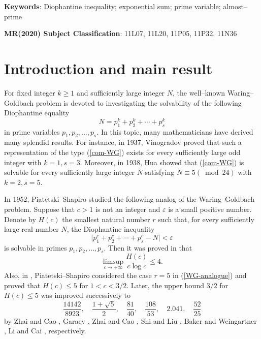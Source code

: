 \documentclass[a4paper,oneside,11pt]{article}%
\numberwithin{equation}{section}
\begin{document}
{\textbf{Keywords}}: Diophantine inequality; exponential sum; prime variable; almost--prime


{\textbf{MR(2020) Subject Classification}}: 11L07, 11L20, 11P05, 11P32, 11N36



\section{Introduction and main result}
For fixed integer $k\geqslant1$ and sufficiently large integer $N$, the well--known Waring--Goldbach problem is devoted to investigating the solvability of the following Diophantine equality
\begin{equation}\label{com-WG}
  N=p_1^k+p_2^k+\cdots+p_s^k
\end{equation}
in prime variables $p_1,p_2,\dots,p_s$. In this topic, many mathematicians have derived many splendid results. For instance, in 1937, Vinogradov \cite{Vinogradov-1937} proved that such a representation of the type (\ref{com-WG}) exists for every sufficiently large odd integer with $k=1,s=3$. Moreover, in 1938, Hua \cite{Hua-1938} showed that (\ref{com-WG}) is solvable
for every sufficiently large integer $N$ satisfying $N\equiv 5(\bmod {24})$ with $k=2,s=5$.

In 1952, Piatetski--Shapiro \cite{Piatetski-Shapiro-1952} studied the following analog of the Waring--Goldbach problem. Suppose that $c>1$ is not an integer and $\varepsilon$ is a small positive number. Denote by $H(c)$ the smallest natural number $r$ such that, for every
sufficiently large real number $N$, the Diophantine inequality
\begin{equation}\label{WG-analogue}
  \big|p_1^c+p_2^c+\cdots+p_s^c-N\big|<\varepsilon
\end{equation}
is solvable in primes $p_1,p_2,\dots,p_s$. Then it was proved in \cite{Piatetski-Shapiro-1952} that
\begin{equation*}
 \limsup_{c\to+\infty}\frac{H(c)}{c\log c}\leqslant 4.
\end{equation*}
Also, in \cite{Piatetski-Shapiro-1952}, Piatetski--Shapiro considered the case $r=5$ in (\ref{WG-analogue}) and proved that
$H(c)\leqslant5$ for $1<c<3/2$. Later, the upper bound $3/2$ for $H(c)\leqslant5$ was improved
successively to
\begin{equation*}
  \frac{14142}{8923},\quad \frac{1+\sqrt{5}}{2},\quad \frac{81}{40},\quad \frac{108}{53}, \quad 2.041, \quad \frac{52}{25}
\end{equation*}
by Zhai and Cao \cite{Zhai-Cao-2003}, Garaev \cite{Garaev-2003}, Zhai and Cao \cite{Zhai-Cao-2007}, Shi and Liu \cite{Shi-Liu-2013}, Baker and Weingartner \cite{Baker-Weingartner-2013},  Li and Cai \cite{Li-Cai-2020}, respectively.
\end{document}
